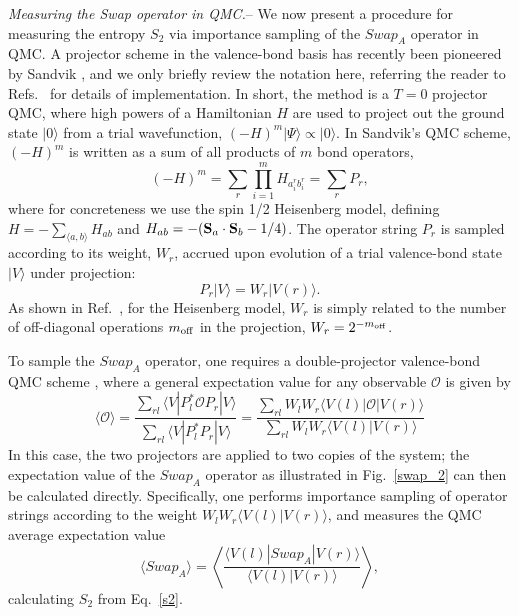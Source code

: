 \documentclass[prl,aps,twocolumn,floatfix,amsmath,amssymb,superscriptaddress,tightenlines]{revtex4}
\begin{document}
{\it Measuring the Swap operator in QMC.}--
We now present a procedure for measuring the entropy $S_2$ via importance sampling of the $Swap_A$ operator in QMC.  A
projector scheme in the valence-bond basis has recently been pioneered by Sandvik \cite{Sandvik}, and we only briefly
review the notation here, referring the reader to Refs.~\cite{Sandvik,Beach,AWSloop} for details of implementation.
In short, the method is a $T=0$ projector QMC, where high powers of
a Hamiltonian $H$ are used to project out the ground state $|0\rangle$ from a trial wavefunction, 
$(-H)^m|\Psi \rangle \propto |0\rangle$.  In Sandvik's QMC scheme, $(-H)^m$ is written as a sum of all products of $m$ bond
operators,
\begin{equation}
(-H)^m = \sum_r \prod_{i=1}^m H_{a_i^r b_i^r} = \sum_r P_r,
\end{equation}
where for concreteness we use the spin 1/2 Heisenberg model, defining $H=-\sum_{\langle a,b \rangle}H_{ab}$ and 
$H_{ab} = -({\bf S}_a \cdot {\bf S}_b - 1/4)$.  The operator string $P_r$ is sampled according to its weight, $W_r$, accrued upon
evolution of a trial valence-bond state $|V \rangle$ under projection:
\begin{equation}
P_r |V \rangle = W_r |V(r) \rangle.
\end{equation}
As shown in Ref.~\cite{Sandvik}, for the Heisenberg model, $W_r$ is simply related to the number of off-diagonal 
operations $m_{\rm off}$ in the projection, $W_r = 2^{-m_{\rm off}}$.

To sample the $Swap_A$ operator, one requires a double-projector valence-bond QMC scheme \cite{Sandvik}, where
a general expectation value for any observable $\mathcal{O}$ is given by
\begin{equation}
\label{expect}
\langle \mathcal{O} \rangle = \frac{\sum_{rl} \langle V | P_l^* \mathcal{O} P_r | V \rangle} {\sum_{rl} \langle V | P_l^* P_r | V \rangle} 
= \frac{\sum_{rl} W_l W_r \langle V(l) | \mathcal{O} | V(r) \rangle} {\sum_{rl} W_l W_r \langle V(l) | V(r) \rangle}
\end{equation} 
In this case, the two projectors are applied to two copies of the system; 
the expectation value of the $Swap_A$ operator as illustrated in Fig.~\ref{swap_2} 
can then be calculated directly.  Specifically, one 
performs importance sampling of operator strings according to the weight $W_l W_r \langle V(l) | V(r) \rangle$, and measures
the QMC average expectation value
\begin{equation}
\langle Swap_A \rangle =  \left\langle{ \frac{ \langle V(l) | Swap_A | V(r) \rangle}{\langle V(l) | V(r) \rangle}  }\right\rangle,
\label{Swap}
\end{equation}
calculating $S_2$ from Eq.~\eqref{s2}.
\end{document}
